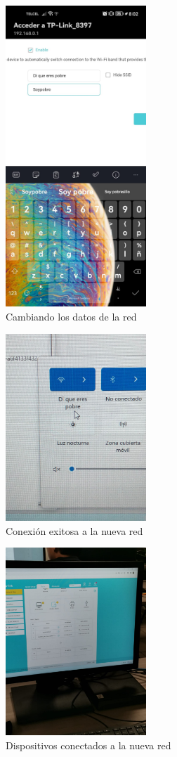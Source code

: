 \documentclass[11pt]{article}
\begin{document}
\begin{figure}[htbp]
\centering
\includegraphics[width=200px]{./cambiando-red.jpeg}
\caption{Cambiando los datos de la red}
\end{figure}

\begin{figure}[htbp]
\centering
\includegraphics[width=200px]{./red-cambiada.jpeg}
\caption{Conexión exitosa a la nueva red}
\end{figure}

\begin{figure}[htbp]
\centering
\includegraphics[width=200px]{./portal-dispositivos.jpeg}
\caption{Dispositivos conectados a la nueva red}
\end{figure}
\end{document}
